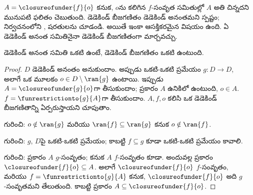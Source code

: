 \documentclass[../../../include/open-logic-section]{subfiles}
\begin{document}
$A = \closureofunder{f}{o}$ కనుక, $o$ను  కలిగిన
$f$-సంవృత సమితుల్లో $A$ అతి చిన్నదని మునుపటి ఫలితం చెబుతుంది.
డెడెకిండ్ బీజగణితం డెడెకిండ్ అనంతమని స్పష్టం; నిర్వచనంలోని
,  షరతులను చూడండి.
అయితే ఇంకా ఆసక్తికరమైన విషయం ఉంది. ఏ డెడెకిండ్ అనంత సమితినైనా
డెడెకిండ్ బీజగణితంగా మార్చవచ్చు.

\begin{thm}
డెడెకిండ్ అనంత సమితి ఒకటి ఉంటే, డెడెకిండ్ బీజగణితం ఒకటి ఉంటుంది.
\end{thm}

\begin{proof}
$D$ డెడెకిండ్ అనంతం అనుకుందాం. అప్పుడు ఒకటి-ఒకటి ప్రమేయం
$g \colon D \to D$, అలాగే ఒక మూలకం $o \in D \setminus \ran{g}$
ఉంటాయి. ఇప్పుడు $A = \closureofunder{g}{o}$గా తీసుకుందాం;
 ప్రకారం $A$ ఉనికిలో ఉంటుంది, $o \in A$.
$f = \funrestrictionto{g}{A}$గా తీసుకుందాం. $A, f, o$ కలిసి ఒక
డెడెకిండ్ బీజగణితాన్ని ఏర్పరుస్తాయని చూపుతాం.

 గురించి: $o \notin \ran{g}$ మరియు
$\ran{f} \subseteq \ran{g}$ కనుక $o\notin \ran{f}$.

 గురించి: $g$, $D$పై ఒకటి-ఒకటి ప్రమేయం;
కాబట్టి $f \subseteq g$ కూడా ఒకటి-ఒకటి ప్రమేయం కావాలి.

 గురించి:  ప్రకారం $A$
$g$-సంవృతం; కనుక $A$ $f$-సంవృతం కూడా. అందువల్ల
 ప్రకారం $\closureofunder{f}{o} \subseteq A$.
అలాగే $\closureofunder{f}{o}$ $f$-సంవృతం, మరియు
$f = \funrestrictionto{g}{A}$ కనుక, $\closureofunder{f}{o}$
అది $g$-సంవృతమని తేలుతుంది. కాబట్టి  ప్రకారం
$A \subseteq \closureofunder{f}{o}$.
\end{proof}
\end{document}
